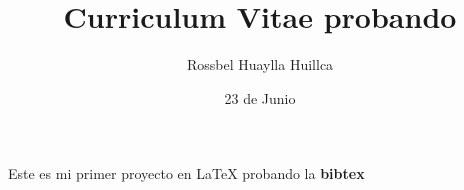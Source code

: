 \documentclass[12pt,letterpaper,landscape]{article}
\author{Rossbel Huaylla Huillca}
\title{Curriculum Vitae probando}
\date {23 de Junio}
\begin{document}
\maketitle 
Este es mi primer proyecto en \LaTeX
probando la \textbf{bibtex}
\end{document}
